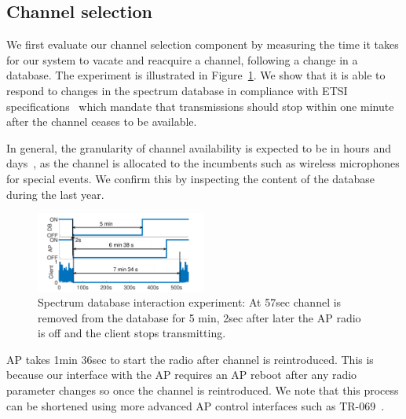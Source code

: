 \subsection{Channel selection}
\label{sec:database-eval}
We first evaluate our channel selection component by measuring the time it takes for our system to vacate and reacquire a channel, following a change in a database. The experiment is illustrated in Figure~\ref{fig:paws}.
We show that it is able to respond to changes in the spectrum database in compliance with ETSI specifications~\cite{etsi_tvws} which mandate that transmissions should stop within one minute after the channel ceases to be available.

In general, the granularity of channel availability is expected to be in hours and days~\cite{Rice_af}, as the channel is allocated to the incumbents such as wireless microphones for special events. We confirm this by inspecting the content of the database during the last year. 
 

\begin{figure}[htb!]
  \vskip -12pt
  \centering
  \hskip -8pt
    \includegraphics[width=0.5\textwidth]{./figs/paws.pdf}
  \vskip -6pt
  \caption{Spectrum database interaction experiment: At 57sec channel is removed from the database for 5 min, 2sec after later the AP radio is off and the client stops transmitting.}
  \label{fig:paws}
  \vskip -6pt
\end{figure}


AP takes 1min 36sec to start the radio after channel is reintroduced. This is because our interface with the AP requires an AP reboot after any radio parameter changes so once the channel is reintroduced. We note that this process can be shortened using more advanced AP control interfaces such as TR-069~\cite{tr69}. 

